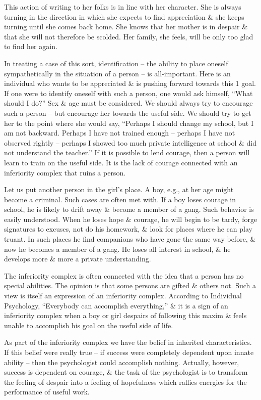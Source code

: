 \documentclass{article}
\begin{document}
This action of writing to her folks is in line with her character. She is always turning in the direction in which she expects to find appreciation \& she keeps turning until she comes back home. She knows that her mother is in despair \& that she will not therefore be scolded. Her family, she feels, will be only too glad to find her again.

In treating a case of this sort, identification -- the ability to place oneself sympathetically in the situation of a person -- is all-important. Here is an individual who wants to be appreciated \& is pushing forward towards this 1 goal. If one were to identify oneself with such a person, one would ask himself, ``What should I do?'' Sex \& age must be considered. We should always try to encourage such a person -- but encourage her towards the useful side. We should try to get her to the point where she would say, ``Perhaps I should change my school, but I am not backward. Perhaps I have not trained enough -- perhaps I have not observed rightly -- perhaps I showed too much private intelligence at school \& did not understand the teacher.'' If it is possible to lend courage, then a person will learn to train on the useful side. It is the lack of courage connected with an inferiority complex that ruins a person.

Let us put another person in the girl's place. A boy, e.g., at her age might become a criminal. Such cases are often met with. If a boy loses courage in school, he is likely to drift away \& become a member of a gang. Such behavior is easily understood. When he loses hope \& courage, he will begin to be tardy, forge signatures to excuses, not do his homework, \& look for places where he can play truant. In such places he find companions who have gone the same way before, \& now he becomes a member of a gang. He loses all interest in school, \& he develops more \& more a private understanding.

The inferiority complex is often connected with the idea that a person has no special abilities. The opinion is that some persons are gifted \& others not. Such a view is itself an expression of an inferiority complex. According to Individual Psychology, ``Everybody can accomplish everything,'' \& it is a sign of an inferiority complex when a boy or girl despairs of following this maxim \& feels unable to accomplish his goal on the useful side of life.

As part of the inferiority complex we have the belief in inherited characteristics. If this belief were really true -- if success were completely dependent upon innate ability -- then the psychologist could accomplish nothing. Actually, however, success is dependent on courage, \& the task of the psychologist is to transform the feeling of despair into a feeling of hopefulness which rallies energies for the performance of useful work.
\end{document}
